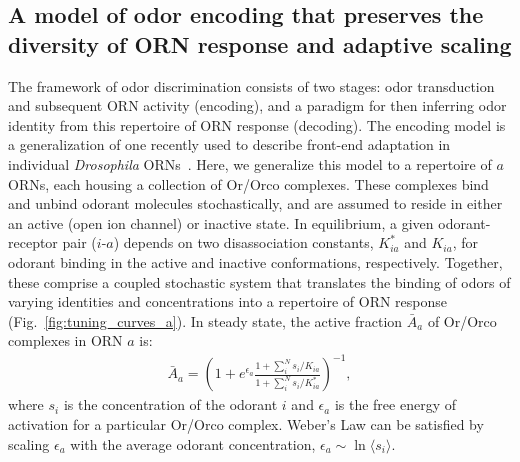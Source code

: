 \subsection{A model of odor encoding that preserves the diversity of ORN response and adaptive scaling}


The framework of odor discrimination consists of two stages: odor transduction and subsequent ORN activity (encoding), and a paradigm for then inferring odor identity from this repertoire of ORN response (decoding). The encoding model is a generalization of one recently used to describe front-end adaptation in individual \textit{Drosophila} ORNs~\cite{srinivas_elife}. %
Here, we generalize this model to a repertoire of $a$ ORNs, each housing a collection of Or/Orco complexes. These complexes bind and unbind odorant molecules stochastically, and are assumed to reside in either an active (open ion channel) or inactive state. In equilibrium, a given odorant-receptor pair ($i$-$a$) depends on two disassociation constants, $K^*_{ia}$ and $K_{ia}$, for odorant binding in the active and inactive conformations, respectively. Together, these comprise a coupled stochastic system that translates the binding of odors of varying identities and concentrations into a repertoire of ORN response (Fig.~\ref{fig:tuning_curves_a}). In steady state, the active fraction $\bar A_a$ of Or/Orco complexes in ORN $a$ is:
\begin{align}
\bar{A}_a = \left(1 + e^{\epsilon_a}\frac{1 + \sum_i^N s_i/K_{ia}}{1 + \sum_i^N s_i/K^*_{ia}}\right)^{-1},
\label{eq:steady_state_act}
\end{align}
where $s_i$ is the concentration of the odorant $i$ and $\epsilon_a$ is the free energy of activation for a particular Or/Orco complex. %
Weber's Law can be satisfied by scaling $\epsilon_a$ with the average odorant concentration, $\epsilon_a \sim \ln \langle s_i \rangle$.%




